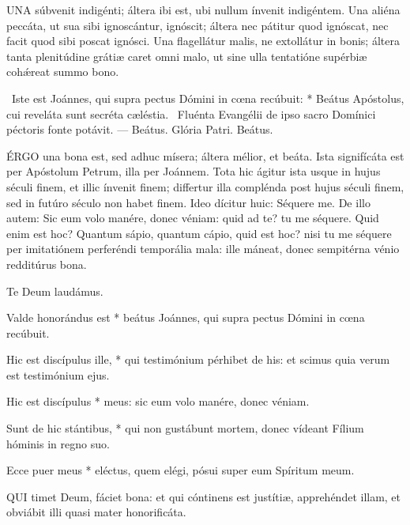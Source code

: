
\lettrine[lines=2]{U}{NA} súbvenit indigénti; áltera ibi est, ubi nullum ínvenit indigéntem. Una aliéna peccáta, ut sua sibi ignoscántur, ignóscit; áltera nec pátitur quod ignóscat, nec facit quod sibi poscat ignósci. Una flagellátur malis, ne extollátur in bonis; áltera tanta plenitúdine grátiæ caret omni malo, ut sine ulla tentatióne supérbiæ cohǽreat summo bono.

\R\ Iste est Joánnes, qui supra pectus Dómini in cœna recúbuit: * Beátus Apóstolus, cui reveláta sunt secréta cæléstia. \V\ Fluénta Evangélii de ipso sacro Domínici péctoris fonte potávit. --- Beátus. Glória Patri. Beátus.


\lettrine[lines=2]{É}{RGO} una bona est, sed adhuc mísera; áltera mélior, et beáta. Ista signifícáta est per Apóstolum Petrum, illa per Joánnem. Tota hic ágitur ista usque in hujus séculi finem, et illic ínvenit finem; differtur illa complénda post hujus séculi finem, sed in futúro século non habet finem. Ideo dícitur huic: Séquere me. De illo autem: Sic eum volo manére, donec véniam: quid ad te? tu me séquere. Quid enim est hoc? Quantum sápio, quantum cápio, quid est hoc? nisi tu me séquere per imitatiónem perferéndi temporália mala: ille máneat, donec sempitérna vénio redditúrus bona.

 Te Deum laudámus.



 Valde honorándus est * beátus Joánnes, qui supra pectus Dómini in cœna recúbuit.

 Hic est discípulus ille, * qui testimónium pérhibet de his: et scimus quia verum est testimónium ejus.

 Hic est discípulus * meus: sic eum volo manére, donec véniam.

 Sunt de hic stántibus, * qui non gustábunt mortem, donec vídeant Fílium hóminis in regno suo.

 Ecce puer meus * eléctus, quem elégi, pósui super eum Spíritum meum.


\lettrine[lines=2]{Q}{UI} timet Deum, fáciet bona: et qui cóntinens est justítiæ, apprehéndet illam, et obviábit illi quasi mater honorificáta.

